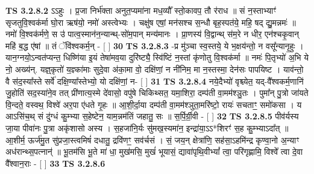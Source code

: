 \documentclass[17pt]{extarticle}
\begin{document}
                  \newline
                                \textbf{ TS 3.2.8.2} \newline
                  ऽऽहुः । प्र॒जा निर्भ॑क्ता अनुत॒प्यमा॑ना मध॒व्यौ᳚ स्तो॒कावप॒ तौ र॑राध ॥ सं न॒स्ताभ्याꣳ॑ सृजतुवि॒श्वक॑र्मा घो॒रा ऋष॑यो॒ नमो॑ अस्त्वेभ्यः । चक्षु॑ष एषां॒ मन॑सश्च स॒न्धौ बृह॒स्पत॑ये॒ महि॒ षद् द्यु॒मन्नमः॑ ॥ नमो॑ वि॒श्वक॑र्मणे॒ स उ॑ पात्व॒स्मान॑न॒न्यान्थ्-सो॑म॒पान् मन्य॑मानः । प्रा॒णस्य॑ वि॒द्वान्थ् स॑म॒रे न धीर॒ एन॑श्चकृ॒वान् महि॑ ब॒द्ध ए॑षां ॥ तं ॅवि॑श्वकर्म॒न् - [  ] \textbf{  30} \newline
                  \newline
                                \textbf{ TS 3.2.8.3} \newline
                  -प्र मु॑ञ्चा स्व॒स्तये॒ ये भ॒क्षय॑न्तो॒ न वसू᳚न्यानृ॒हुः । यान॒ग्नयो॒ऽन्वत॑प्यन्त॒ धिष्णि॑या इ॒यं तेषा॑मव॒या दुरि॑ष्ट्यै॒ स्वि॑ष्टिं न॒स्तां कृ॑णोतु वि॒श्वक॑र्मा ॥ नमः॑ पि॒तृभ्यो॑ अ॒भि ये नो॒ अख्य॑न्. यज्ञ्॒कृतो॑ य॒ज्ञ्का॑माः सुदे॒वा अ॑का॒मा वो॒ दक्षि॑णां॒ न नी॑निम॒ मा न॒स्तस्मा॒ देन॑सः पापयिष्ट । याव॑न्तो॒ वै स॑द॒स्या᳚स्ते सर्वे॑ दक्षि॒ण्या᳚स्तेभ्यो॒ यो दक्षि॑णां॒ न-  [  ] \textbf{  31} \newline
                  \newline
                                \textbf{ TS 3.2.8.4} \newline
                  नये॒दैभ्यो॑ वृश्च्येत॒ यद्-वै᳚श्वकर्म॒णानि॑ जु॒होति॑ सद॒स्या॑ने॒व तत् प्री॑णात्य॒स्मे दे॑वासो॒ वपु॑षे चिकिथ्सत॒ यमा॒शिरा॒ दम्प॑ती वा॒मम॑श्ञु॒तः । पुमा᳚न् पु॒त्रो जा॑यते वि॒न्दते॒ वस्वथ॒ विश्वे॑ अर॒पा ए॑धते गृ॒हः ॥ आ॒शी॒र्दा॒या दम्प॑ती वा॒मम॑श्ञुता॒मरि॑ष्टो॒ रायः॑ सचताꣳ॒॒ समो॑कसा । य आऽसि॑च॒थ् सं दु॑ग्धं कु॒म्भ्या स॒हेष्टेन॒ याम॒न्नम॑तिं जहातु॒ सः ॥ स॒र्पि॒र्ग्री॒वी - [  ] \textbf{  32} \newline
                  \newline
                                \textbf{ TS 3.2.8.5} \newline
                  पीव॑र्यस्य जा॒या पीवा॑नः पु॒त्रा अकृ॑शासो अस्य । स॒हजा॑नि॒र्यः सु॑मख॒स्यमा॑न॒ इन्द्रा॑या॒ऽऽ*शिरꣳ॑ स॒ह कु॒म्भ्याऽदा᳚त् ॥ आ॒शीर्म॒ ऊर्ज॑मु॒त सु॑प्रजा॒स्त्वमिषं॑ दधातु॒ द्रवि॑णꣳ॒॒ सव॑र्चसं । सं॒ जय॒न् क्षेत्रा॑णि॒ सह॑सा॒ऽहमि॑न्द्र कृण्वा॒नो अ॒न्याꣳ अध॑रान्थ्स॒पत्नान्॑ ॥ भू॒तम॑सि भू॒ते मा॑ धा॒ मुख॑मसि॒ मुखं॑ भूयासं॒ द्यावा॑पृथि॒वीभ्यां᳚ त्वा॒ परि॑गृह्णामि॒ विश्वे᳚ त्वा दे॒वा वै᳚श्वान॒राः - [  ] \textbf{  33} \newline
                  \newline
                                \textbf{ TS 3.2.8.6} \newline
\end{document}

